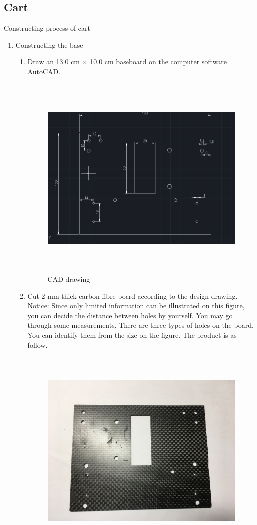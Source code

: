 \subsection{Cart}
Constructing process of cart
\begin{enumerate}
\item Constructing the base
	\begin{enumerate}
	\item	Draw an 13.0 cm $\times$ 10.0 cm baseboard on the computer software AutoCAD.\\
	\begin{figure}
	\begin{center}
	\includegraphics[height=10cm]{figure/procedure/p1}
	\end{center}
 	\caption{CAD drawing \label{fig:cad}}
	\end{figure}
	\item Cut 2 mm-thick carbon fibre board according to the design drawing. Notice: Since only limited information can be illustrated on this figure, you can decide the distance between holes by yourself. You may go through some measurements. There are three types of holes on the board. You can identify them from the size on the figure. The product is as follow. \\
	\begin{figure}
	\begin{center}
	\includegraphics[height=10cm]{figure/procedure/p2}

\end{center}
\end{figure}
\end{enumerate}
\end{enumerate}
